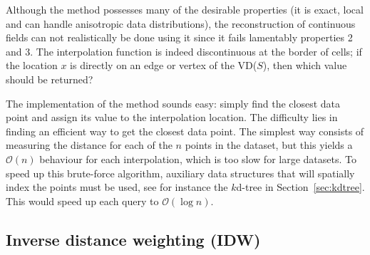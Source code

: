 Although the method possesses many of the desirable properties (it is exact, local and can handle anisotropic data distributions), the reconstruction of continuous fields can not realistically be done using it since it fails lamentably properties 2 and 3. 
The interpolation function is indeed discontinuous at the border of cells; if the location $x$ is directly on an edge or vertex of the VD($S$), then which value should be returned?

The implementation of the method sounds easy: simply find the closest data point and assign its value to the interpolation location. 
The difficulty lies in finding an efficient way to get the closest data point. 
The simplest way consists of measuring the distance for each of the $n$ points in the dataset, but this yields a $\mathcal{O}(n)$ behaviour for each interpolation, which is too slow for large datasets. 
To speed up this brute-force algorithm, auxiliary data structures that will spatially index the points must be used, see for instance the $k$d-tree in Section~\ref{sec:kdtree}.
This would speed up each query to $\mathcal{O}(\log n)$.


\subsection{Inverse distance weighting (\textbf{IDW})}%


